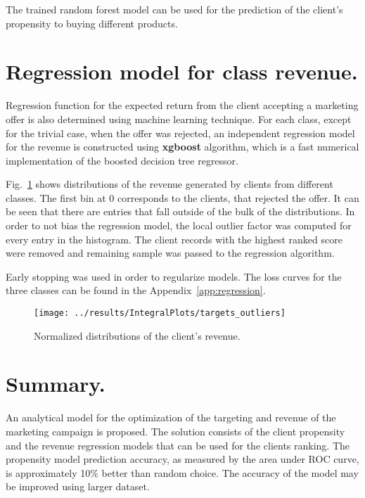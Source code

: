 \documentclass[14pt]{scrartcl}
\begin{document}
The trained random forest model can be used for the prediction of the client's 
propensity to buying different products. 

\section{Regression model for class revenue.}\label{sec:mva_regression}

Regression function for the expected return from the client accepting a marketing offer
is also determined using machine learning technique. For each class, except for the
trivial case, when the offer was rejected, an independent
regression model for the revenue is constructed using \textbf{xgboost} algorithm, which
is a fast numerical implementation of the boosted decision tree regressor.

Fig.~\ref{fig:targets_outliers} shows distributions of the revenue generated
by clients from different classes. The first bin at 0 corresponds to the clients, that
rejected the offer. It can be seen that there are entries that fall outside of the bulk
of the distributions. In order to not bias the regression model, the local outlier
factor was computed for every entry in the histogram. The client records with the 
highest ranked score were removed and remaining sample was passed to the regression
algorithm.

Early stopping was used in order to regularize models. The loss curves for the
three classes can be found in the Appendix~\ref{app:regression}.

\begin{figure}[htpb!]
    \texttt{[image: ../results/IntegralPlots/targets\_outliers]}\\
    \caption{Normalized distributions of the client's revenue.}
    \label{fig:targets_outliers}
\end{figure}

\section{Summary.}
An analytical model for the optimization of the targeting and revenue of the marketing
campaign is proposed. The solution consists of the client propensity and the revenue
regression models that can be used for the clients ranking. The propensity model
prediction accuracy, as measured by the area under ROC curve, is approximately 10\% 
better than random choice. The accuracy of the model may be improved using larger dataset.
\end{document}
